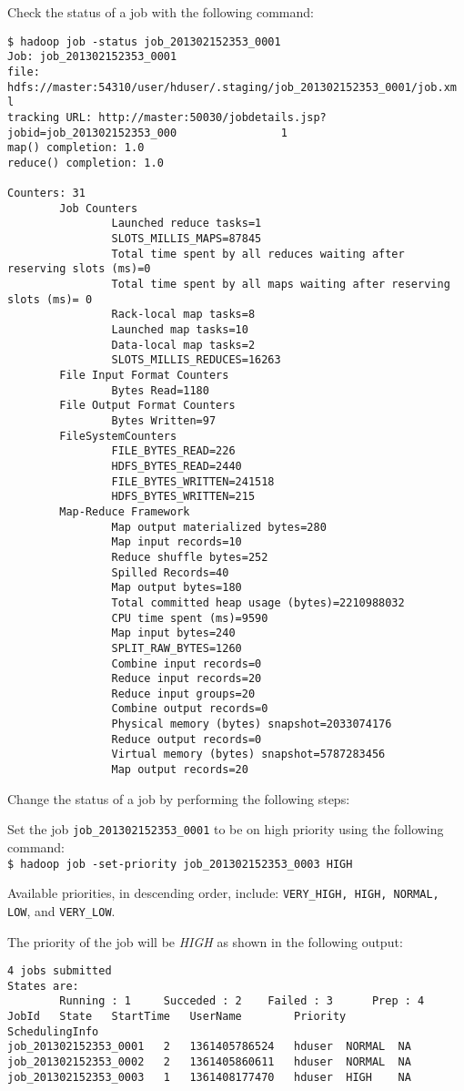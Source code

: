 Check the status of a job with the following command:
\begin{verbatim}
$ hadoop job -status job_201302152353_0001
Job: job_201302152353_0001
file: hdfs://master:54310/user/hduser/.staging/job_201302152353_0001/job.xm                l
tracking URL: http://master:50030/jobdetails.jsp?jobid=job_201302152353_000                1
map() completion: 1.0
reduce() completion: 1.0

Counters: 31
        Job Counters
                Launched reduce tasks=1
                SLOTS_MILLIS_MAPS=87845
                Total time spent by all reduces waiting after reserving slots (ms)=0
                Total time spent by all maps waiting after reserving slots (ms)= 0
                Rack-local map tasks=8
                Launched map tasks=10
                Data-local map tasks=2
                SLOTS_MILLIS_REDUCES=16263
        File Input Format Counters
                Bytes Read=1180
        File Output Format Counters
                Bytes Written=97
        FileSystemCounters
                FILE_BYTES_READ=226
                HDFS_BYTES_READ=2440
                FILE_BYTES_WRITTEN=241518
                HDFS_BYTES_WRITTEN=215
        Map-Reduce Framework
                Map output materialized bytes=280
                Map input records=10
                Reduce shuffle bytes=252
                Spilled Records=40
                Map output bytes=180
                Total committed heap usage (bytes)=2210988032
                CPU time spent (ms)=9590
                Map input bytes=240
                SPLIT_RAW_BYTES=1260
                Combine input records=0
                Reduce input records=20
                Reduce input groups=20
                Combine output records=0
                Physical memory (bytes) snapshot=2033074176
                Reduce output records=0
                Virtual memory (bytes) snapshot=5787283456
                Map output records=20
\end{verbatim}

Change the status of a job by performing the following steps:  

Set the job \verb|job_201302152353_0001| to be on high priority using the following command: \\
\verb|$ hadoop job -set-priority job_201302152353_0003 HIGH|

Available priorities, in descending order, include: \verb|VERY_HIGH, HIGH, NORMAL, LOW|, and \verb|VERY_LOW|.

The priority of the job will be \emph{HIGH} as shown in the following output:
\begin{verbatim}
4 jobs submitted
States are:
        Running : 1     Succeded : 2    Failed : 3      Prep : 4
JobId   State   StartTime   UserName        Priority        SchedulingInfo
job_201302152353_0001   2   1361405786524   hduser  NORMAL  NA
job_201302152353_0002   2   1361405860611   hduser  NORMAL  NA
job_201302152353_0003   1   1361408177470   hduser  HIGH    NA
\end{verbatim}

